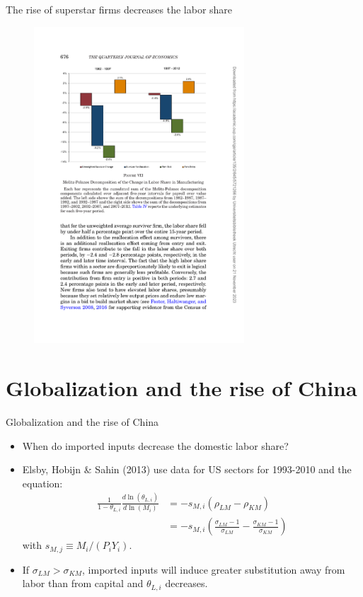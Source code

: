 \documentclass[notes=show]{beamer}
\begin{document}
\begin{frame}{The rise of superstar firms decreases the labor share}
\begin{figure}[p!]
 \includegraphics[width=0.7\textwidth]{figure-ADKPR-7.pdf} 
\end{figure}
\end{frame}

\section{Globalization and the rise of China}

\begin{frame}{Globalization and the rise of China}
\begin{itemize}
\item When do imported inputs decrease the domestic labor share? \medskip 
\item Elsby, Hobijn \& Sahin (2013) use data for US sectors for 1993-2010 and the equation:
\begin{align*}
    \frac{1}{1-\theta_{L,i}} \frac{d \ln(\theta_{L,i})}{d \ln(M_{i})} & = - s_{M,i} \left( \rho_{LM} - \rho_{KM} \right) \tag{EHS-11} \\
    & = - s_{M,i} \left( \frac{\sigma_{LM}-1}{\sigma_{LM}} - \frac{\sigma_{KM}-1}{\sigma_{KM}} \right)  
\end{align*}
with $s_{M,j} \equiv M_{i} / (P_{i}Y_{i})$. \medskip
\item If $ \sigma_{LM} > \sigma_{KM} $, imported inputs will induce greater substitution away from labor than from capital and $ \theta_{L,i}$ decreases.
\end{itemize}
\end{frame}
\end{document}
